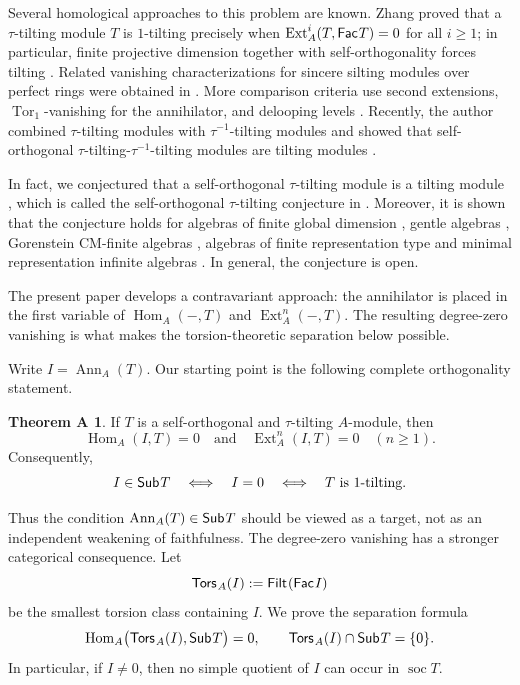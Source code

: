 \documentclass[a4paper,reqno]{amsart}
\theoremstyle{definition}
\newtheorem*{theorema}{Theorem A}
\newcommand{\Ext}{\operatorname{Ext}\nolimits}
\newcommand{\Hom}{\operatorname{Hom}\nolimits}
\newcommand{\Ann}{\operatorname{Ann}\nolimits}
\newcommand{\soc}{\operatorname{soc}\nolimits}
\newcommand{\Fac}{\mathsf{Fac}\hspace{.01in}}
\newcommand{\Filt}{\mathsf{Filt}\hspace{.01in}}
\newcommand{\Sub}{\mathsf{Sub}\hspace{.01in}}
\newcommand{\Tors}{\mathsf{Tors}\hspace{.01in}}
\numberwithin{equation}{section}
\begin{document}
Several homological approaches to this problem are known. Zhang proved
that a $\tau$-tilting module $T$ is $1$-tilting precisely when
$\Ext_A^i(T,\Fac T)=0$ for all $i\geq1$; in particular, finite
projective dimension together with self-orthogonality forces tilting
\cite{Zhang}. Related vanishing characterizations for sincere
silting modules over perfect rings were obtained in \cite{LiuWei}.
More comparison criteria use second extensions,
$\operatorname{Tor}_1$-vanishing for the annihilator, and delooping
levels \cite{CLZZ}. Recently, the author combined $\tau$-tilting modules with $\tau^{-1}$-tilting modules and showed that self-orthogonal $\tau$-tilting-$\tau^{-1}$-tilting modules are tilting modules \cite{Zhang2}.

In fact, we conjectured that a self-orthogonal $\tau$-tilting module is a tilting module \cite{Zhang}, which is called the self-orthogonal $\tau$-tilting conjecture in \cite{CLZZ}. Moreover, it is shown that the conjecture holds for algebras of finite global dimension \cite{Zhang}, gentle algebras \cite{C}, Gorenstein CM-finite algebras \cite{LyW}, algebras of finite representation type and minimal representation infinite algebras \cite{CLZZ}. In general, the conjecture is open.

The present paper develops a contravariant approach:
the annihilator is placed in the first variable of $\Hom_A(-,T)$ and
$\Ext_A^n(-,T)$. The resulting degree-zero vanishing is what makes
the torsion-theoretic separation below possible.

Write $I=\Ann_A(T)$. Our starting point is the following complete
orthogonality statement.

\begin{theorema}
If $T$ is a self-orthogonal and $\tau$-tilting $A$-module, then
\[
                  \Hom_A(I,T)=0
       \quad\text{and}\quad
                  \Ext_A^n(I,T)=0\quad(n\geq1).
\]
Consequently,
\[
 I\in\Sub T\quad\Longleftrightarrow\quad I=0
 \quad\Longleftrightarrow\quad T\text{ is }1\text{-tilting}.
\]
\end{theorema}

Thus the condition $\Ann_A(T)\in\Sub T$ should be viewed as a target,
not as an independent weakening of faithfulness. The degree-zero
vanishing has a stronger categorical consequence. Let
\[
       \Tors_A(I):=\Filt(\Fac I)
\]
be the smallest torsion class containing $I$. We prove the separation
formula
\begin{equation}\label{eq:intro-separation}
       \Hom_A\bigl(\Tors_A(I),\Sub T\bigr)=0,
       \qquad
       \Tors_A(I)\cap\Sub T=\{0\}.
\end{equation}
In particular, if $I\neq0$, then no simple quotient of $I$ can occur
in $\soc T$.
\end{document}
